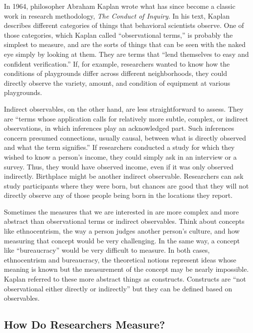 In 1964, philosopher Abraham Kaplan wrote what has since become a classic work in research methodology, \textit{The Conduct of Inquiry}\cite{kaplan2017conduct}. In his text, Kaplan describes different categories of things that behavioral scientists observe. One of those categories, which Kaplan called ``observational terms,'' is probably the simplest to measure, and are the sorts of things that can be seen with the naked eye simply by looking at them. They are terms that ``lend themselves to easy and confident verification.'' If, for example, researchers wanted to know how the conditions of playgrounds differ across different neighborhoods, they could directly observe the variety, amount, and condition of equipment at various playgrounds.

Indirect observables, on the other hand, are less straightforward to assess. They are ``terms whose application calls for relatively more subtle, complex, or indirect observations, in which inferences play an acknowledged part. Such inferences concern presumed connections, usually causal, between what is directly observed and what the term signifies.'' If researchers conducted a study for which they wished to know a person's income, they could simply ask in an interview or a survey. Thus, they would have observed income, even if it was only observed indirectly. Birthplace might be another indirect observable. Researchers can ask study participants where they were born, but chances are good that they will not directly observe any of those people being born in the locations they report.

Sometimes the measures that we are interested in are more complex and more abstract than observational terms or indirect observables. Think about concepts like ethnocentrism, the way a person judges another person's culture, and how measuring that concept would be very challenging. In the same way, a concept like  ``bureaucracy'' would be very difficult to measure. In both cases, ethnocentrism and bureaucracy, the theoretical notions represent ideas whose meaning is known but the measurement of the concept may be nearly impossible. Kaplan referred to these more abstract things as \glspl{construct}. Constructs are ``not observational either directly or indirectly'' but they can be defined based on observables.

\subsection{How Do Researchers Measure?}

